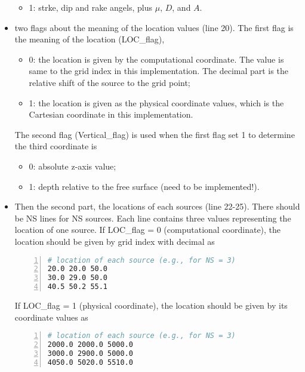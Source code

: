 \begin{itemize}
\begin{itemize}
            \item 1: strke, dip and rake angels, plus $\mu$, $D$, and $A$.
        \end{itemize}
    \item two flags about the meaning of the location values (line 20).
        The first flag is the meaning of the location (LOC\_flag), 
        \begin{itemize}
            \item 0: the location is given by the computational coordinate. The value is same to the grid index in this implementation. 
                The decimal part is the relative shift of the source to the grid point;
            \item 1: the location is given as the physical coordinate values, which is the Cartesian coordinate in this implementation.
        \end{itemize}
        The second flag (Vertical\_flag) is used when the first flag set 1 to determine the third coordinate is
        \begin{itemize}
            \item 0: absolute z-axis value;
            \item 1: depth relative to the free surface (need to be implemented!).
        \end{itemize}
    \item Then the second part, the locations of each sources (line 22-25). There should be NS lines for NS sources.
        Each line contains three values representing the location of one source.
        If LOC\_flag = 0 (computational coordinate), the location should be given by grid index with decimal as
\begin{lstlisting}[language=bash, caption=Source location by computational coordinate,
   numbers=left, numbersep=5pt,numberstyle=\tiny\color{codegray}, commentstyle=\color{codegreen},
   frame=tb]
# location of each source (e.g., for NS = 3)
20.0 20.0 50.0
30.0 29.0 50.0
40.5 50.2 55.1
\end{lstlisting}
        If LOC\_flag = 1 (physical coordinate), the location should be given by its coordinate values as
\begin{lstlisting}[language=bash, caption=Source location by physical coordinate,
   numbers=left, numbersep=5pt,numberstyle=\tiny\color{codegray}, commentstyle=\color{codegreen},
   frame=tb]
# location of each source (e.g., for NS = 3)
2000.0 2000.0 5000.0
3000.0 2900.0 5000.0
4050.0 5020.0 5510.0
\end{lstlisting}

\end{itemize}
